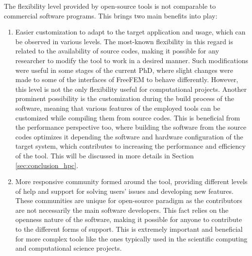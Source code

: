 The flexibility level provided by open-source tools is not comparable to commercial software programs. This brings two main benefits into play: 
\begin{enumerate}
\item
Easier customization to adapt to the target application and usage, which can be observed in various levels. The most-known flexibility in this regard is related to the availability of source codes, making it possible for any researcher to modify the tool to work in a desired manner. Such modifications were useful in some stages of the current PhD, where slight changes were made to some of the interfaces of FreeFEM to behave differently. However, this level is not the only flexibility useful for computational projects. Another prominent possibility is the customization during the build process of the software, meaning that various features of the employed tools can be customized while compiling them from source codes. This is beneficial from the performance perspective too, where building the software from the source codes optimizes it depending the software and hardware configuration of the target system, which contributes to increasing the performance and efficiency of the tool. This will be discussed in more details in Section \ref{sec:conclusion_hpc}.
\item
More responsive community formed around the tool, providing different levels of help and support for solving users' issues and developing new features. These communities are unique for open-source paradigm as the contributors are not necessarily the main software developers. This fact relies on the openness nature of the software, making it possible for anyone to contribute to the different forms of support. This is extremely important and beneficial for more complex tools like the ones typically used in the scientific computing and computational science projects. 
\end{enumerate}

